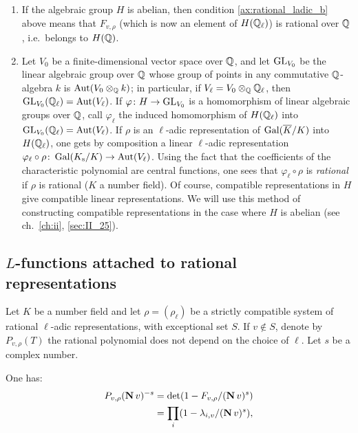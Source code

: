 \begin{obs}
\begin{enumerate}
\item If the algebraic group $H$ is abelian, then condition
	\ref{ax:rational_ladic_b} above means that $F_{v, \rho}$ (which is now
	an element of $H(\mathbb{Q}_\ell)$) is rational over $\mathbb{Q}$, i.e.\ belongs to
	$H(\mathbb{Q})$.
\item Let $V_0$ be a finite-dimensional vector space over $\mathbb{Q}$, and
	let $\operatorname{GL}_{V_0}$ be the linear algebraic group over $\mathbb{Q}$ whose group of
	points in any commutative $\mathbb{Q}$-algebra $k$ is $\operatorname{Aut}(V_0 \otimes_{\mathbb{Q}} k)$; in 
	particular, if $V_\ell = V_0 \otimes_{\mathbb{Q}} \mathbb{Q}_\ell$, then
	$\operatorname{GL}_{V_0}(\mathbb{Q}_\ell) = \operatorname{Aut}(V_\ell)$. If $\varphi \colon H \to
	\operatorname{GL}_{V_0}$ is a homomorphism of linear algebraic groups over $\mathbb{Q}$, call
	$\varphi_\ell$ the induced homomorphism of $H(\mathbb{Q}_\ell)$ into
	$\operatorname{GL}_{V_0}(\mathbb{Q}_\ell) = \operatorname{Aut}(V_\ell)$. If $\rho$ is an $\ell$-adic
	representation of $\operatorname{Gal}(\overline{K}/K)$ into $H(\mathbb{Q}_\ell)$, one gets by
	composition a linear $\ell$-adic representation $\varphi_\ell \circ
	\rho \colon \operatorname{Gal}(K_{\mathrm{s}}/K) \to \operatorname{Aut}(V_\ell)$. Using the fact that the
	coefficients of the characteristic polynomial are central functions,
	one sees that
	\dpage
	$\varphi_\ell \circ \rho$ is \emph{rational} if $\rho$ is rational ($K$
	a number field).  Of course, compatible representations in $H$ give
	compatible linear representations. We will use this method of
	constructing compatible representations in the case where $H$ is
	abelian (see ch.~\ref{ch:ii}, \ref{sec:II_25}).
\end{enumerate}
\end{obs}

\subsection{\texorpdfstring{$L$}{L}-functions attached to rational 
representations}

Let $K$ be a number field and let $\rho=(\rho_\ell)$ be a strictly compatible 
system of rational $\ell$-adic representations, with exceptional set $S$. If $v 
\not\in S$, denote by $P_{v,\rho}(T)$ the rational polynomial does not depend 
on the choice of $\ell$. Let $s$ be a complex number. 

One has:
\begin{align*}
	P_{v,\rho}(\operatorname{\mathbf{N}} v)^{-s} 
	&= \det(1 - F_{v,\rho} / (\operatorname{\mathbf{N}} v)^{s})\\
	&= \prod_i (1 - \lambda_{i,v} / (\operatorname{\mathbf{N}} v)^{s}),
\end{align*}

